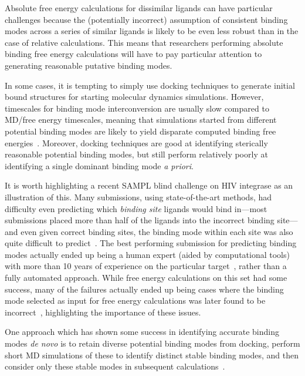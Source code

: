 \documentclass[9pt,bestpractices]{livecoms}
\begin{document}
Absolute free energy calculations for dissimilar ligands can have particular challenges because the (potentially incorrect) assumption of consistent binding modes across a series of similar ligands is likely to be even less robust than in the case of relative calculations.
This means that researchers performing absolute binding free energy calculations will have to pay particular attention to generating reasonable putative binding modes.

In some cases, it is tempting to simply use docking techniques to generate initial bound structures for starting molecular dynamics simulations.
However, timescales for binding mode interconversion are usually slow compared to MD/free energy timescales, meaning that simulations started from different potential binding modes are likely to yield disparate computed binding free energies~\cite{mobley2006use, palma2012computation, mobley2012perspective, gill2018binding}. Moreover, docking techniques are good at identifying sterically reasonable potential binding modes, but still perform relatively poorly at identifying a single dominant binding mode \emph{a priori}. 


It is worth highlighting a recent SAMPL blind challenge on HIV integrase as an illustration of this. 
Many submissions, using state-of-the-art methods, had difficulty even predicting which \emph{binding site} ligands would bind in---most submissions placed more than half of the ligands into the incorrect binding site---and even given correct binding sites, the binding mode within each site was also quite difficult to predict~\cite{mobley2014blind}.
The best performing submission for predicting binding modes actually ended up being a human expert (aided by computational tools) with more than 10 years of experience on the particular target~\cite{voet2014combining}, rather than a fully automated approach.
While free energy calculations on this set had some success, many of the failures actually ended up being cases where the binding mode selected as input for free energy calculations was later found to be incorrect~\cite{gallicchio2014virtual}, highlighting the importance of these issues.

One approach which has shown some success in identifying accurate binding modes \emph{de novo} is to retain diverse potential binding modes from docking, perform short MD simulations of these to identify distinct stable binding modes, and then consider only these stable modes in subsequent calculations~\cite{gallicchio2014virtual, mobley2006use,rocklin2013blind, boyce2009predicting, mobley2007predicting}.
\end{document}
